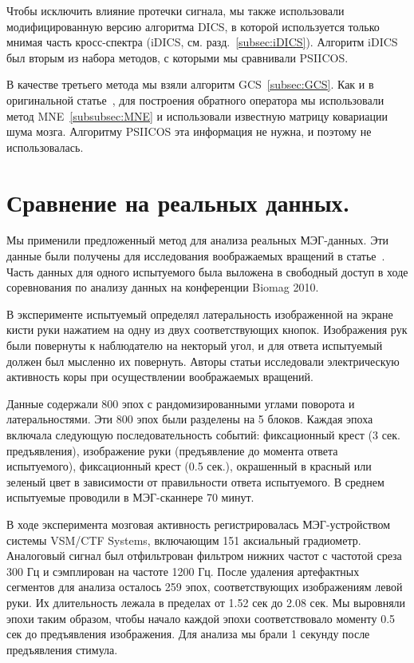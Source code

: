 Чтобы исключить влияние протечки сигнала, мы также использовали
модифицированную версию алгоритма DICS, в которой используется только мнимая
часть кросс-спектра (iDICS, см. разд.~\ref{subsec:iDICS}). Алгоритм iDICS был
вторым из набора методов, с которыми мы сравнивали PSIICOS.\@

В качестве третьего метода мы взяли алгоритм GCS~\ref{subsec:GCS}.  Как и в
оригинальной статье~\cite{Wens2015}, для построения обратного оператора мы
использовали метод MNE~\ref{subsubsec:MNE} и использовали известную матрицу
ковариации шума мозга. Алгоритму PSIICOS эта информация не нужна, и поэтому не
использовалась.

\section{Сравнение на реальных данных.}\label{sec:validation_on_real_data}

Мы применили предложенный метод для анализа реальных МЭГ-данных. Эти данные
были получены для исследования воображаемых вращений в
статье~\cite{DeLange2008}. Часть данных для одного испытуемого была выложена в
свободный доступ в ходе соревнования по анализу данных на конференции Biomag
2010.

В эксперименте испытуемый определял латеральность изображенной на экране кисти
руки нажатием на одну из двух соответствующих кнопок.  Изображения рук были
повернуты к наблюдателю на некторый угол, и для ответа испытуемый должен был
мысленно их повернуть. Авторы статьи исследовали электрическую активность коры
при осуществлении воображаемых вращений.

Данные содержали 800 эпох с рандомизированными углами поворота и
латеральностями. Эти 800 эпох были разделены на 5 блоков. Каждая эпоха включала
следующую последовательность событий: фиксационный крест (3 сек. предъявления),
изображение руки (предъявление до момента ответа испытуемого), фиксационный
крест (0.5 сек.), окрашенный в красный или зеленый цвет в зависимости от
правильности ответа испытуемого. В среднем испытуемые проводили в МЭГ-сканнере
70 минут.

В ходе эксперимента мозговая активность регистрировалась МЭГ-устройством
системы VSM/CTF Systems, включающим 151 аксиальный градиометр. Аналоговый
сигнал был отфильтрован  фильтром нижних частот с частотой среза 300 Гц и
сэмплирован на частоте 1200 Гц. После удаления артефактных сегментов для
анализа осталось 259 эпох, соответствующих изображениям левой руки. Их
длительность лежала в пределах от 1.52 сек до 2.08 сек. Мы выровняли эпохи
таким образом, чтобы начало каждой эпохи соответствовало моменту 0.5 сек до
предъявления изображения. Для анализа мы брали 1 секунду после предъявления
стимула.

